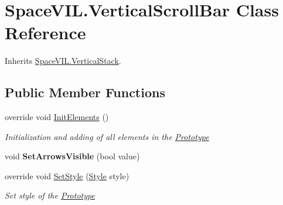 \hypertarget{class_space_v_i_l_1_1_vertical_scroll_bar}{}\section{Space\+V\+I\+L.\+Vertical\+Scroll\+Bar Class Reference}
\label{class_space_v_i_l_1_1_vertical_scroll_bar}


Inherits \mbox{\hyperlink{class_space_v_i_l_1_1_vertical_stack}{Space\+V\+I\+L.\+Vertical\+Stack}}.

\subsection*{Public Member Functions}
\begin{DoxyCompactItemize}
\item 
override void \mbox{\hyperlink{class_space_v_i_l_1_1_vertical_scroll_bar_aa74f074945d0b53b3a2dc0eb97904ce1}{Init\+Elements}} ()
\begin{DoxyCompactList}\small\item\em Initialization and adding of all elements in the \mbox{\hyperlink{class_space_v_i_l_1_1_prototype}{Prototype}} \end{DoxyCompactList}\item 
\mbox{\label{class_space_v_i_l_1_1_vertical_scroll_bar_a0afe09bf320889045661c5cd24fcf4ad}} 
void {\bfseries Set\+Arrows\+Visible} (bool value)
\item 
override void \mbox{\hyperlink{class_space_v_i_l_1_1_vertical_scroll_bar_a94bfbdb137de9b7301e6e07074eb2069}{Set\+Style}} (\mbox{\hyperlink{class_space_v_i_l_1_1_decorations_1_1_style}{Style}} style)
\begin{DoxyCompactList}\small\item\em Set style of the \mbox{\hyperlink{class_space_v_i_l_1_1_prototype}{Prototype}} \end{DoxyCompactList}\end{DoxyCompactItemize}
